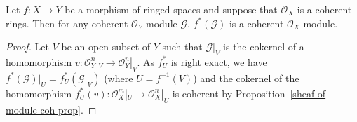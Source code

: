 \begin{proposition}\label{sheaf of module coh pullback if coh sheaf of ring}
Let $f:X\to Y$ be a morphism of ringed spaces and suppose that $\mathscr{O}_X$ is a coherent rings. Then for any coherent $\mathscr{O}_Y$-module $\mathscr{G}$, $f^*(\mathscr{G})$ is a coherent $\mathscr{O}_X$-module.
\end{proposition}
\begin{proof}
Let $V$ be an open subset of $Y$ such that $\mathscr{G}|_V$ is the cokernel of a homomorphism $v:\mathscr{O}_Y^n|_V\to\mathscr{O}_Y^n|_V$. As $f_U^*$ is right exact, we have $f^*(\mathscr{G})|_U=f_U^*(\mathscr{G}|_V)$ (where $U=f^{-1}(V)$) and the cokernel of the homomorphism $f_U^*(v):\mathscr{O}_X^m|_U\to\mathscr{O}_X^n|_U$ is coherent by Proposition~\ref{sheaf of module coh prop}. 
\end{proof}
